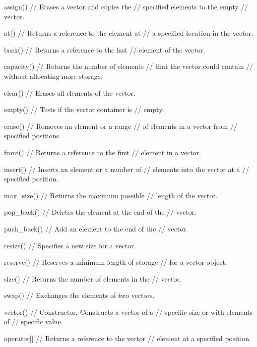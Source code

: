 \begin{console}
assign()        // Erases a vector and copies the
                // specified elements to the empty
                // vector.

at()            // Returns a reference to the element at
                // a specified location in the vector.

back()          // Returns a reference to the last
                // element of the vector.

capacity()      // Returns the number of elements
                // that the vector could contain
                // without allocating more storage.

clear()         // Erases all elements of the vector.

empty()         // Tests if the vector container is
                // empty.

erase()         // Removes an element or a range
                // of elements in a vector from
                // specified positions.

front()         // Returns a reference to the first
                // element in a vector.

insert()        // Inserts an element or a number of
                // elements into the vector at a
                // specified position.

max_size()      // Returns the maximum possible
                // length of the vector.

pop_back()      // Deletes the element at the end of the
                // vector.

push_back()     // Add an element to the end of the
                // vector.

resize()        // Specifies a new size for a vector.

reserve()       // Reserves a minimum length of storage
                // for a vector object.

size()          // Returns the number of elements in the
                // vector.

swap()          // Exchanges the elements of two vectors.

vector()        // Constructor. Constructs a vector of a
                // specific size or with elements of
                // specific value.

operator[]      // Returns a reference to the vector
                // element at a specified position.
\end{console}

